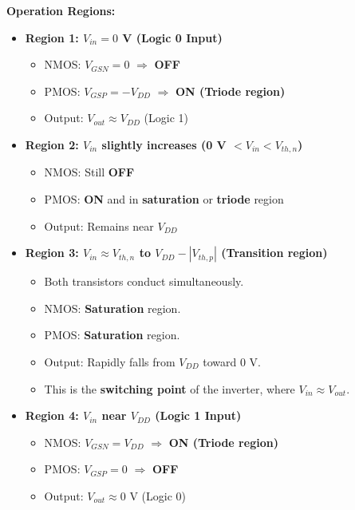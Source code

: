 \documentclass[a4paper,12pt]{article}
\begin{document}
\textbf{Operation Regions:}
\begin{itemize}
  \item \textbf{Region 1: $V_{in} = 0$ V (Logic 0 Input)}  
    \begin{itemize}
      \item NMOS: $V_{GSN} = 0$ $\Rightarrow$ \textbf{OFF}
      \item PMOS: $V_{GSP} = -V_{DD}$ $\Rightarrow$ \textbf{ON (Triode region)}
      \item Output: $V_{out} \approx V_{DD}$ (Logic 1)
    \end{itemize}

  \item \textbf{Region 2: $V_{in}$ slightly increases (0 V $< V_{in} < V_{th,n}$)}  
    \begin{itemize}
      \item NMOS: Still \textbf{OFF}
      \item PMOS: \textbf{ON} and in \textbf{saturation} or \textbf{triode} region
      \item Output: Remains near $V_{DD}$
    \end{itemize}

  \item \textbf{Region 3: $V_{in} \approx V_{th,n}$ to $V_{DD} - |V_{th,p}|$ (Transition region)}  
    \begin{itemize}
      \item Both transistors conduct simultaneously.
      \item NMOS: \textbf{Saturation} region.
      \item PMOS: \textbf{Saturation} region.
      \item Output: Rapidly falls from $V_{DD}$ toward $0$ V.
      \item This is the \textbf{switching point} of the inverter, where $V_{in} \approx V_{out}$.
    \end{itemize}

  \item \textbf{Region 4: $V_{in}$ near $V_{DD}$ (Logic 1 Input)}  
    \begin{itemize}
      \item NMOS: $V_{GSN} = V_{DD}$ $\Rightarrow$ \textbf{ON (Triode region)}
      \item PMOS: $V_{GSP} = 0$ $\Rightarrow$ \textbf{OFF}
      \item Output: $V_{out} \approx 0$ V (Logic 0)
    \end{itemize}
\end{itemize}
\end{document}
